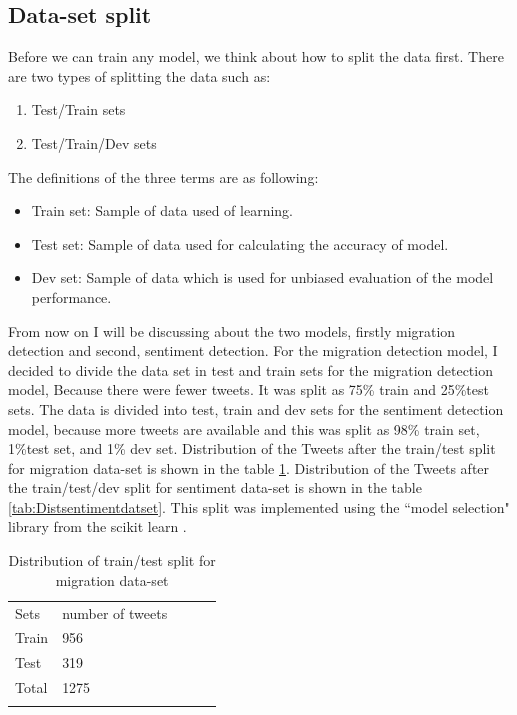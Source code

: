 \subsection{Data-set split}
Before we can train any model, we think about how to split the data first. There are two types of splitting the data such as:
\begin{enumerate}
    \item Test/Train sets
  \item Test/Train/Dev sets
\end{enumerate}
The definitions of the three terms are as following:
\begin{itemize}
     \item Train set: Sample of data used of learning.
 
    \item Test set: Sample of data used for calculating the accuracy of model.
      \item Dev set: Sample of data which is used for unbiased evaluation of the model performance.
\end{itemize}

From now on I will be discussing about the two models, firstly migration detection and second, sentiment detection. For the migration detection model, I decided to divide the data set in test and train sets for the migration detection model, Because there were fewer tweets. It was split as 75\% train and 25\%test sets. The data is divided into test, train and dev sets for the sentiment detection model, because more tweets are available and this was split as 98\% train set, 1\%test set, and 1\% dev set.
Distribution of the Tweets after the train/test split for migration data-set is shown in the table \ref{tab:Distmigrationdataset}. Distribution of the Tweets after the train/test/dev split for sentiment data-set is shown in the table \ref{tab:Distsentimentdatset}. This split was implemented using the ``model selection" library from the scikit learn \cite{scikit-learn}.


\begin{table}[]
\centering
\begin{tabular}{lllll}
\cline{1-2}
\multicolumn{1}{|l|}{Sets}   & \multicolumn{1}{l|}{number of tweets} &  &  &  \\ \cline{1-2}
\multicolumn{1}{|l|}{Train} & \multicolumn{1}{l|}{956}  &  &  &  \\ \cline{1-2}
\multicolumn{1}{|l|}{Test} & \multicolumn{1}{l|}{319}  &  &  &  \\ \cline{1-2}
\multicolumn{1}{|l|}{Total}   & \multicolumn{1}{l|}{1275}  &  &  &  \\ \cline{1-2}
                            &                           &  &  & 
\label{tab:Distribution of sentiment class}
\end{tabular}
\caption{Distribution of train/test split for migration data-set}
\label{tab:Distmigrationdataset}
\end{table}

